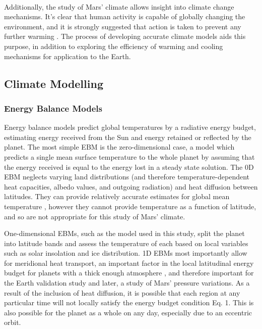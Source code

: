 \documentclass[12pt,onecolumn]{revtex4-2}    %
\begin{document}
\

Additionally, the study of Mars' climate allows insight into climate change mechanisms. It's clear that human activity is capable of globally changing the environment, and it is strongly suggested that action is taken to prevent any further warming \cite{IPCC23}. The process of developing accurate climate models aids this purpose, in addition to exploring the efficiency of warming and cooling mechanisms for application to the Earth.


\subsection{Climate Modelling}

\subsubsection{Energy Balance Models}
Energy balance models predict global temperatures by a radiative energy budget, estimating energy received from the Sun and energy retained or reflected by the planet. The most simple EBM is the zero-dimensional case, a model which predicts a single mean surface temperature to the whole planet by assuming that the energy received is equal to the energy lost in a steady state solution. The 0D EBM neglects varying land distributions (and therefore temperature-dependent heat capacities, albedo values, and outgoing radiation) and heat diffusion between latitudes. They can provide relatively accurate estimates for global mean temperature \cite{L20}, however they cannot provide temperature as a function of latitude, and so are not appropriate for this study of Mars' climate.
\

One-dimensional EBMs, such as the model used in this study, split the planet into latitude bands and assess the temperature of each based on local variables such as solar insolation and ice distribution. 1D EBMs most importantly allow for meridional heat transport, an important factor in the local latitudinal energy budget for planets with a thick enough atmosphere \cite{SMS08}, and therefore important for the Earth validation study and later, a study of Mars' pressure variations. As a result of the inclusion of heat diffusion, it is possible that each region at any particular time will not locally satisfy the energy budget condition Eq. 1. This is also possible for the planet as a whole on any day, especially due to an eccentric orbit. %
\end{document}
